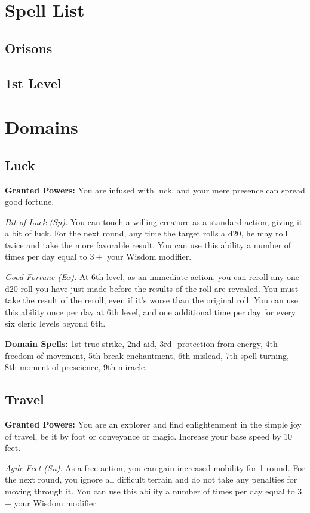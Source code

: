 \documentclass{spelllist}
\begin{document}
  \section*{Spell List}
  
  \subsection*{Orisons}
  
  \subsection*{1st Level}
  \section*{Domains}
  \subsection*{Luck}
  \textbf{Granted Powers:} You are infused with luck, and your
mere presence can spread good fortune.

  \emph{Bit of Luck (Sp):} You can touch a willing creature as a
  standard action, giving it a bit of luck. For the next round,
  any time the target rolls a d20, he may roll twice and take
  the more favorable result. You can use this ability a number
  of times per day equal to $3 +$ your Wisdom modifier.
  
  \emph{Good Fortune (Ex):} At 6th level, as an immediate action,
  you can reroll any one d20 roll you have just made before
  the results of the roll are revealed. You must take the result
  of the reroll, even if it’s worse than the original roll. You can
  use this ability once per day at 6th level, and one additional
  time per day for every six cleric levels beyond 6th.
  
  \textbf{Domain Spells:} 1st-true strike, 2nd-aid, 3rd-
  protection from energy, 4th-freedom of movement, 5th-break
  enchantment, 6th-mislead, 7th-spell turning, 8th-moment
  of prescience, 9th-miracle.
  
  \subsection*{Travel}
  \textbf{Granted Powers:} You are an explorer and find
  enlightenment in the simple joy of travel, be it by foot or
  conveyance or magic. Increase your base speed by 10 feet.
  
  \emph{Agile Feet (Su):} As a free action, you can gain increased
  mobility for 1 round. For the next round, you ignore all
  difficult terrain and do not take any penalties for moving
  through it. You can use this ability a number of times per
  day equal to 3 + your Wisdom modifier.
  
\end{document}
